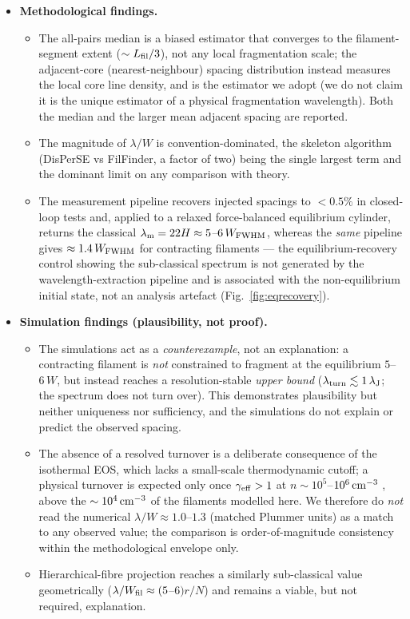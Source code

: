 \documentclass[usenatbib,twoside,twocolumn]{mnras}
\begin{document}
\begin{itemize}
    \item \textbf{Methodological findings.}
    \begin{itemize}
        \item The all-pairs median is a biased estimator that converges to the filament-segment extent ($\sim L_{\rm fil}/3$), not any local fragmentation scale; the adjacent-core (nearest-neighbour) spacing distribution instead measures the local core line density, and is the estimator we adopt (we do not claim it is the unique estimator of a physical fragmentation wavelength). Both the median and the larger mean adjacent spacing are reported.
        \item The magnitude of $\lambda/W$ is convention-dominated, the skeleton algorithm (DisPerSE vs FilFinder, a factor of two) being the single largest term and the dominant limit on any comparison with theory.
        \item The measurement pipeline recovers injected spacings to $<0.5\%$ in closed-loop tests and, applied to a relaxed force-balanced equilibrium cylinder, returns the classical $\lambda_{\rm m}=22H\approx5$--$6\,W_{\rm FWHM}$, whereas the \emph{same} pipeline gives $\approx1.4\,W_{\rm FWHM}$ for contracting filaments --- the equilibrium-recovery control showing the sub-classical spectrum is not generated by the wavelength-extraction pipeline and is associated with the non-equilibrium initial state, not an analysis artefact (Fig.~\ref{fig:eqrecovery}).
    \end{itemize}

    \item \textbf{Simulation findings (plausibility, not proof).}
    \begin{itemize}
        \item The simulations act as a \emph{counterexample}, not an explanation: a contracting filament is \emph{not} constrained to fragment at the equilibrium $5$--$6\,W$, but instead reaches a resolution-stable \emph{upper bound} ($\lambda_{\rm turn}\lesssim1\,\lambda_{\rm J}$; the spectrum does not turn over). This demonstrates plausibility but neither uniqueness nor sufficiency, and the simulations do not explain or predict the observed spacing.
        \item The absence of a resolved turnover is a deliberate consequence of the isothermal EOS, which lacks a small-scale thermodynamic cutoff; a physical turnover is expected only once $\gamma_{\rm eff}>1$ at $n\sim10^{5}$--$10^{6}\,{\rm cm^{-3}}$ \citep{Larson1985,Glover2012}, above the $\sim10^{4}\,{\rm cm^{-3}}$ of the filaments modelled here. We therefore do \emph{not} read the numerical $\lambda/W\approx1.0$--$1.3$ (matched Plummer units) as a match to any observed value; the comparison is order-of-magnitude consistency within the methodological envelope only.
        \item Hierarchical-fibre projection reaches a similarly sub-classical value geometrically ($\lambda/W_{\rm fil}\approx(5$--$6)r/N$) and remains a viable, but not required, explanation.
    \end{itemize}


\end{itemize}
\end{document}
